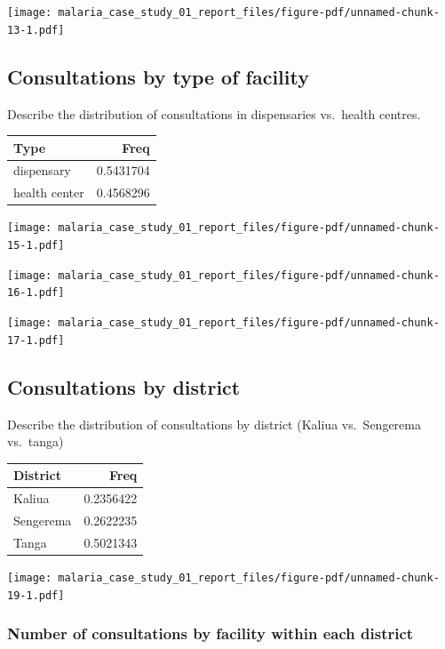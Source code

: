 \documentclass[
  letterpaper,
  DIV=11,
  numbers=noendperiod,
  oneside]{scrreprt}
\begin{document}
\texttt{[image: malaria\_case\_study\_01\_report\_files/figure-pdf/unnamed-chunk-13-1.pdf]}

\hypertarget{consultations-by-type-of-facility}{%
\subsection{Consultations by type of
facility}\label{consultations-by-type-of-facility}}

Describe the distribution of consultations in dispensaries vs.~health
centres.

\begin{longtable}[]{@{}lr@{}}
\toprule\noalign{}
Type & Freq \\
\midrule\noalign{}
\endhead
\bottomrule\noalign{}
\endlastfoot
dispensary & 0.5431704 \\
health center & 0.4568296 \\
\end{longtable}

\texttt{[image: malaria\_case\_study\_01\_report\_files/figure-pdf/unnamed-chunk-15-1.pdf]}

\texttt{[image: malaria\_case\_study\_01\_report\_files/figure-pdf/unnamed-chunk-16-1.pdf]}

\texttt{[image: malaria\_case\_study\_01\_report\_files/figure-pdf/unnamed-chunk-17-1.pdf]}

\hypertarget{consultations-by-district}{%
\subsection{Consultations by district}\label{consultations-by-district}}

Describe the distribution of consultations by district (Kaliua
vs.~Sengerema vs.~tanga)

\begin{longtable}[]{@{}lr@{}}
\toprule\noalign{}
District & Freq \\
\midrule\noalign{}
\endhead
\bottomrule\noalign{}
\endlastfoot
Kaliua & 0.2356422 \\
Sengerema & 0.2622235 \\
Tanga & 0.5021343 \\
\end{longtable}

\texttt{[image: malaria\_case\_study\_01\_report\_files/figure-pdf/unnamed-chunk-19-1.pdf]}

\hypertarget{number-of-consultations-by-facility-within-each-district}{%
\subsubsection{Number of consultations by facility within each
district}\label{number-of-consultations-by-facility-within-each-district}}
\end{document}
